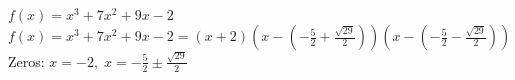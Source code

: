{$f(x) = x^3 + 7x^2+9x-2$}
{$f(x) = x^3 + 7x^2+9x-2 = (x+2) \left(x - \left( -\frac{5}{2}+\frac{\sqrt{29}}{2}\right) \right) \left(x - \left( -\frac{5}{2}-\frac{\sqrt{29}}{2}\right) \right)$ \\
Zeros:  $x = -2, \; x = -\frac{5}{2} \pm \frac{\sqrt{29}}{2}$}